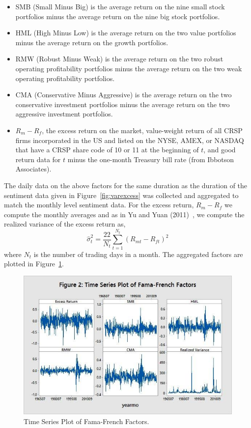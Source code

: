 \begin{itemize}
\item SMB (Small Minus Big) is the average return on the nine small stock portfolios minus the average return on the nine big stock portfolios.

\item HML (High Minus Low) is the average return on the two value portfolios minus the average return on the growth portfolios.

\item RMW (Robust Minus Weak) is the average return on the two robust operating profitability portfolios minus the average return on the two weak operating profitability portfolios.

\item CMA (Conservative Minus Aggressive) is the average return on the two conservative investment portfolios minus the average return on the two aggressive investment portfolios.

\item $R_m-R_f$, the excess return on the market, value-weight return of all CRSP firms incorporated in the US and listed on the NYSE, AMEX, or NASDAQ that have a CRSP share code of 10 or 11 at the beginning of $t$, and good return data for $t$ minus the one-month Treasury bill rate (from Ibbotson Associates).
\end{itemize}

The daily data on the above factors for the same duration as the duration of the sentiment data given in Figure~\ref{fig:varexcess} was collected and aggregated to match the monthly level sentiment data. For the excess return, $R_m-R_f$ we compute the monthly averages and as in Yu and Yuan (2011)~\cite{yuyuan}, we compute the realized variance of the excess return as,
	\begin{equation}\label{fig:varexcess}
	\widehat{\sigma}_t^2=\frac{22}{N_t}\sum_{t=1}^{N_t}(R_{mt}-R_{ft})^2
	\end{equation}
where $N_t$ is the number of trading days in a month. The aggregated factors are plotted in Figure~\ref{fig:timefamafrench}.
 
	\begin{figure}[!ht]
	\centering
	\includegraphics[width=\textwidth]{chapters/chapter_news_an/figures/ch4sec1famafrench.jpg}
	\caption{Time Series Plot of Fama-French Factors.\label{fig:timefamafrench}}
	\end{figure}

